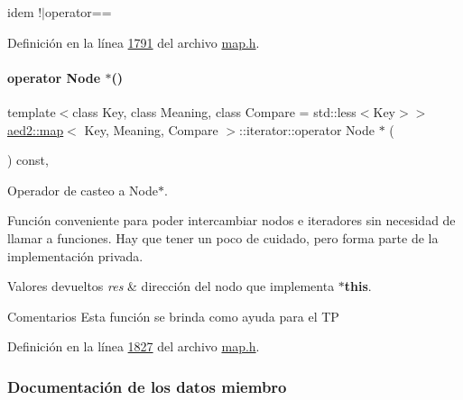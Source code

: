 idem !$\vert$operator== 



Definición en la línea \hyperlink{map_8h_source_l01791}{1791} del archivo \hyperlink{map_8h_source}{map.\+h}.

\mbox{\label{classaed2_1_1map_1_1iterator_af609b04effc1c7ff9ec33b40c31bdc95_af609b04effc1c7ff9ec33b40c31bdc95}} 
\paragraph{\texorpdfstring{operator Node $\ast$()}{operator Node *()}}
{\footnotesize\ttfamily template$<$class Key, class Meaning, class Compare = std\+::less$<$\+Key$>$$>$ \\
\hyperlink{classaed2_1_1map}{aed2\+::map}$<$ Key, Meaning, Compare $>$\+::iterator\+::operator Node $\ast$ (\begin{DoxyParamCaption}{ }\end{DoxyParamCaption}) const\hspace{0.3cm}{\ttfamily [inline]}, {\ttfamily [private]}}



Operador de casteo a Node$\ast$. 

Función conveniente para poder intercambiar nodos e iteradores sin necesidad de llamar a funciones. Hay que tener un poco de cuidado, pero forma parte de la implementación privada.


\begin{DoxyRetVals}{Valores devueltos}
{\em res} & dirección del nodo que implementa {\bfseries $\ast$this}.\\
\hline
\end{DoxyRetVals}
\begin{DoxyRemark}{Comentarios}
Esta función se brinda como ayuda para el TP 
\end{DoxyRemark}


Definición en la línea \hyperlink{map_8h_source_l01827}{1827} del archivo \hyperlink{map_8h_source}{map.\+h}.



\subsubsection{Documentación de los datos miembro}
\mbox{\label{classaed2_1_1map_1_1iterator_adf8633ef71bb6c1fc01c0abe8728fd93_adf8633ef71bb6c1fc01c0abe8728fd93}} 
